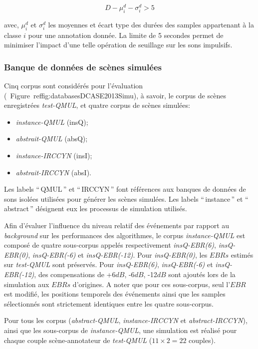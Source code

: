 \begin{equation}
D-\mu_i^d-\sigma_i^d>5
\end{equation}

avec, $\mu_i^d$ et $\sigma_i^d$ les moyennes et écart type des durées des samples appartenant à la classe $i$ pour une annotation donnée. La limite de 5 secondes permet de minimiser l'impact d'une telle opération de seuillage sur les sons impulsifs.

\subsubsection{Banque de données de scènes simulées}
\label{sec:ch7_datasetEtEbr}

Cinq corpus sont considérés pour l'évaluation (\cf~Figure~ref{fig:databasesDCASE2013Simu}), à savoir, le corpus de scènes enregistrées \emph{test-QMUL}, et quatre corpus de scènes simulées:

\begin{itemize}
\item \emph{instance-QMUL} (insQ);
\item \emph{abstrait-QMUL} (absQ);
\item \emph{instance-IRCCYN} (insI);
\item \emph{abstrait-IRCCYN} (absI).
\end{itemize}

Les labels ``\,QMUL\,'' et ``\,IRCCYN\,'' font références aux banques de données de sons isolées utilisées pour générer les scènes simulées. Les labels ``\,instance\,'' et ``\,abstract\,'' désignent eux les processus de simulation utilisés. 

Afin d'évaluer l'influence du niveau relatif des événements par rapport au \emph{background} sur les performances des algorithmes, le corpus \emph{instance-QMUL} est composé de quatre sous-corpus appelés respectivement \emph{insQ-EBR(6)}, \emph{insQ-EBR(0)}, \emph{insQ-EBR(-6)} et \emph{insQ-EBR(-12)}. Pour \emph{insQ-EBR(0)}, les $EBRs$ estimés sur \emph{test-QMUL} sont préservés.  Pour \emph{insQ-EBR(6)}, \emph{insQ-EBR(-6)} et \emph{insQ-EBR(-12)}, des compensations de +6$dB$, -6$dB$, -12$dB$ sont ajoutés lors de la simulation aux $EBRs$ d'origines. A noter que pour ces sous-corpus, seul l'$EBR$ est modifié, les positions temporels des événements ainsi que les samples sélectionnés sont strictement identiques entre les quatre sous-corpus.

Pour tous les corpus (\emph{abstract-QMUL}, \emph{instance-IRCCYN} et \emph{abstract-IRCCYN}), ainsi que les sous-corpus de \emph{instance-QMUL}, une simulation est réalisé pour chaque couple scène-annotateur de \emph{test-QMUL} ($11\times2=22$ couples). 

